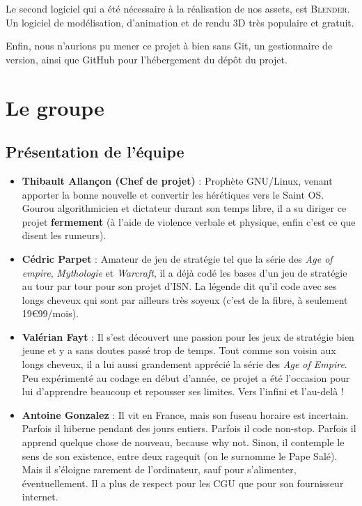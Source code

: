 \documentclass[12pt]{report}
\begin{document}
Le second logiciel qui a été nécessaire à la réalisation de nos assets, est
\textsc{Blender}. Un logiciel de modélisation, d’animation et de rendu 3D très
populaire et gratuit.

Enfin, nous n’aurions pu mener ce projet à bien sans Git, un gestionnaire de
version, ainsi que GitHub pour l'hébergement du dépôt du projet.

\chapter{Le groupe}

\section{Présentation de l'équipe}

\begin{itemize}[label=\textbullet]
    \item \textbf{Thibault Allançon (Chef de projet)} : Prophète GNU/Linux,
        venant apporter la bonne nouvelle et convertir les hérétiques vers le
        Saint OS. Gourou algorithmicien et dictateur durant son temps libre, il
        a su diriger ce projet \textbf{fermement} (à l’aide de violence verbale
        et physique, enfin c’est ce que disent les rumeurs).
    \item \textbf{Cédric Parpet} : Amateur de jeu de stratégie tel que la série
        des \textit{Age of empire}, \textit{Mythologie} et \textit{Warcraft}, il
        a déjà codé les bases d’un jeu de stratégie au tour par tour pour son
        projet d’ISN. La légende dit qu’il code avec ses longs cheveux qui sont
        par ailleurs très soyeux (c’est de la fibre, à seulement
        19\euro99/mois).
    \item \textbf{Valérian Fayt} : Il s’est découvert une passion pour les jeux
        de stratégie bien jeune et y a sans doutes passé trop de temps. Tout
        comme son voisin aux longs cheveux, il a lui aussi grandement apprécié
        la série des \textit{Age of Empire}. Peu expérimenté au codage en début
        d'année, ce projet a été l'occasion pour lui d'apprendre beaucoup et
        repousser ses limites. Vers l’infini et l’au-delà !
    \item \textbf{Antoine Gonzalez} : Il vit en France, mais son fuseau horaire
        est incertain. Parfois il hiberne pendant des jours entiers. Parfois il
        code non-stop. Parfois il apprend quelque chose de nouveau, because why
        not. Sinon, il contemple le sens de son existence, entre deux ragequit
        (on le surnomme le Pape Salé). Mais il s’éloigne rarement de
        l’ordinateur, sauf pour s’alimenter, éventuellement. Il a plus de
        respect pour les CGU que pour son fournisseur internet.
\end{itemize}
\end{document}

